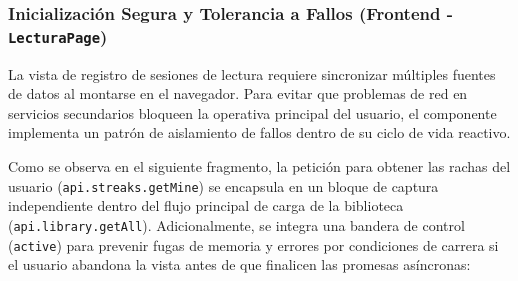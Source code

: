 \documentclass[12pt, atypical, journal]{article}
\begin{document}
\subsubsection{Inicialización Segura y Tolerancia a Fallos (Frontend - \texttt{LecturaPage})}
La vista de registro de sesiones de lectura requiere sincronizar múltiples fuentes de datos al montarse en el navegador. Para evitar que problemas de red en servicios secundarios bloqueen la operativa principal del usuario, el componente implementa un patrón de aislamiento de fallos dentro de su ciclo de vida reactivo.

Como se observa en el siguiente fragmento, la petición para obtener las rachas del usuario (\texttt{api.streaks.getMine}) se encapsula en un bloque de captura independiente dentro del flujo principal de carga de la biblioteca (\texttt{api.library.getAll}). Adicionalmente, se integra una bandera de control (\texttt{active}) para prevenir fugas de memoria y errores por condiciones de carrera si el usuario abandona la vista antes de que finalicen las promesas asíncronas:
\end{document}
